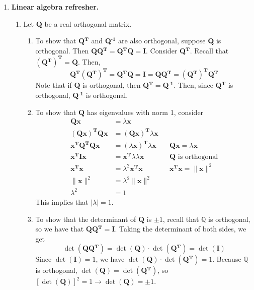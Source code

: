 \documentclass [12pt] {article}
\newcommand{\Q}{\mathbb{Q}}
\newcommand{\T}{\bf{T}}
\newcommand{\x}{\bf{x}}
\renewcommand{\bf}[1]{\textbf{{#1}}}
\begin{document}
\begin{enumerate}
    \item \bf{Linear algebra refresher.}
        \begin{enumerate}
            \item 
                \newcommand{\QT}{\bf{Q$^{\bf{T}}$}}
                \newcommand{\QI}{\bf{Q$^{\bf{-1}}$}}
                \newcommand{\QQ}{\bf{Q}}
                Let $\QQ$ be a real orthogonal matrix.
                \begin{enumerate}
                    \item To show that $\QT$ and \QI {} are also orthogonal, suppose $\QQ$ is 
                        orthogonal. Then $\QQ \QT = \QT \QQ = \bf{I}$. Consider \QT. 
                        Recall that $\left(\QT\right)^{\bf{T}} = \QQ$. Then,
                        \[\QT \left( \QT \right)^{\T} = \QT \QQ = \bf{I} = \QQ \QT = \left( \QT \right)^{\T} \QT\]
                        Note that if $\QQ$ is orthogonal, then $\QT = \QI$. Then, since $\QT$ is 
                        orthogonal, $\QI$ is orthogonal.

                    \item To show that $\QQ$ has eigenvalues with norm 1, consider
                        \begin{align*}
                            \QQ \x &= \lambda \x \\
                            \left( \QQ \x \right)^{\T} \QQ \x &= \left( \QQ \x \right)^{\T} \lambda \x \\
                            \x^{\T} \QQ^{\T} \QQ \x &= \left( \lambda \x \right)^{\T} \lambda \x && \QQ \x = \lambda \x \\
                            \x^{\T} \bf{I} \x &= \x^{\T} \lambda \lambda \x && \text{$\QQ$ is orthogonal} \\
                            \x^{\T} \x &= \lambda^2 \x^{\T} \x && \x^{\T} \x = \|\x\|^2 \\
                            \|\x\|^2 &= \lambda^2 \|\x\|^2 \\
                            \lambda^2 &= 1
                        \end{align*}
                        This implies that $|\lambda| = 1$.

                    \item To show that the determinant of $\QQ$ is $\pm 1$, recall that $\Q$ is 
                        orthogonal, so we have that $\QQ \QT = \bf{I}$. Taking the determinant of 
                        both sides, we get
                        \[\det \left( \QQ \QT \right) = \det \left( \QQ \right) \cdot 
                        \det \left( \QT \right) = \det \left( \bf{I} \right)\]
                        Since $\det \left( \bf{I} \right) = 1$, we have
                        $\det \left( \QQ \right) \cdot \det \left( \QT \right) = 1$. Because $\Q$
                        is orthogonal, $\det \left( \QQ \right) = \det \left( \QT \right)$, so
                        $\left[ \det \left( \QQ \right) \right]^2 = 1 \to \det \left( \QQ \right) = \pm 1$.


\end{enumerate}
\end{enumerate}
\end{enumerate}
\end{document}
